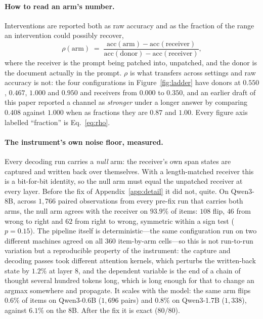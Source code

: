 \documentclass{article}
\begin{document}
\paragraph{How to read an arm's number.} Interventions are reported both as raw
accuracy and as the fraction of the range an intervention could possibly
recover,
\begin{equation}
\rho(\text{arm}) \;=\;
\frac{\text{acc}(\text{arm}) - \text{acc}(\text{receiver})}
     {\text{acc}(\text{donor}) - \text{acc}(\text{receiver})},
\end{equation}
where the receiver is the prompt being patched into, unpatched, and the donor is
the document actually in the prompt. $\rho$ is what transfers across settings and
raw accuracy is not: the four configurations in Figure~\ref{fig:ladder} have
donors at $0.550$, $0.467$, $1.000$ and $0.950$ and receivers from $0.000$ to
$0.350$, and an earlier draft of this paper reported a channel as \emph{stronger}
under a longer answer by comparing $0.408$ against $1.000$ when as fractions
they are $0.87$ and $1.00$. Every figure axis labelled ``fraction'' is
Eq.~\ref{eq:rho}.

\paragraph{The instrument's own noise floor, measured.} Every decoding run
carries a \emph{null} arm: the receiver's own span states are captured and
written back over themselves. With a length-matched receiver this is a
bit-for-bit identity, so the null arm must equal the unpatched receiver at every
layer. Before the fix of Appendix~\ref{app:detail} it did not, quite. On
Qwen3-8B, across $1{,}766$ paired observations from every pre-fix run that
carries both arms, the null arm agrees with the receiver on $93.9\%$ of items:
$108$ flip, $46$ from wrong to right and $62$ from right to wrong, symmetric
within a sign test ($p = 0.15$). The pipeline itself is
deterministic---the same configuration run on two different machines agreed on
all $360$ item-by-arm cells---so this is not run-to-run variation but a
reproducible property of the instrument: the capture and decoding passes took
different attention kernels, which perturbs the written-back state by $1.2\%$ at
layer 8, and the dependent variable is the end of a chain of thought several
hundred tokens long, which is long enough for that to change an argmax somewhere
and propagate. It scales with the model: the same arm flips $0.6\%$ of items on
Qwen3-0.6B ($1{,}696$ pairs) and $0.8\%$ on Qwen3-1.7B ($1{,}338$), against
$6.1\%$ on the 8B. After the fix it is exact ($80/80$).
\end{document}
